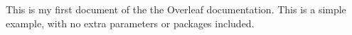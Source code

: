\documentclass{article}
\begin{document}
This is my first document of the the Overleaf documentation. This is a simple example, with no 
extra parameters or packages included.
\end{document}
